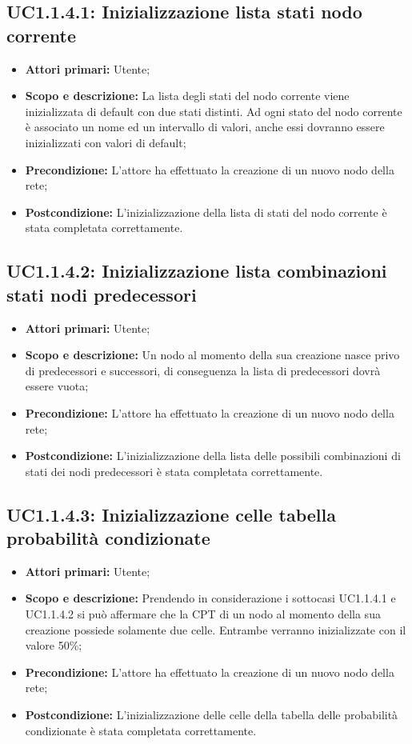 \subsection{UC1.1.4.1: Inizializzazione lista stati nodo corrente} 
\begin{itemize} 
	\item{\textbf{Attori primari:} Utente;} 
	\item{\textbf{Scopo e descrizione:} La lista degli stati del nodo corrente viene inizializzata di default con due stati distinti. Ad ogni stato del nodo corrente è associato un nome ed un intervallo di valori, anche essi dovranno essere inizializzati con valori di default;} 
	\item{\textbf{Precondizione:} L'attore ha effettuato la creazione di un nuovo nodo della rete;} 
	\item{\textbf{Postcondizione:} L'inizializzazione della lista di stati del nodo corrente è stata completata correttamente.} 
\end{itemize} 
\subsection{UC1.1.4.2: Inizializzazione lista combinazioni stati nodi predecessori} 
\begin{itemize} 
	\item{\textbf{Attori primari:} Utente;} 
	\item{\textbf{Scopo e descrizione:} Un nodo al momento della sua creazione nasce privo di predecessori e successori, di conseguenza la lista di predecessori dovrà essere vuota;} 
	\item{\textbf{Precondizione:} L'attore ha effettuato la creazione di un nuovo nodo della rete;} 
	\item{\textbf{Postcondizione:} L'inizializzazione della lista delle possibili combinazioni di stati dei nodi predecessori è stata completata correttamente.} 
\end{itemize} 
\subsection{UC1.1.4.3: Inizializzazione celle tabella probabilità condizionate} 
\begin{itemize} 
	\item{\textbf{Attori primari:} Utente;} 
	\item{\textbf{Scopo e descrizione:} Prendendo in considerazione i sottocasi UC1.1.4.1 e UC1.1.4.2 si può affermare che la CPT di un nodo al momento della sua creazione possiede solamente due celle. Entrambe verranno inizializzate con il valore 50\%;} 
	\item{\textbf{Precondizione:} L'attore ha effettuato la creazione di un nuovo nodo della rete;} 
	\item{\textbf{Postcondizione:} L'inizializzazione delle celle della tabella delle probabilità condizionate è stata completata correttamente.} 
\end{itemize} 
